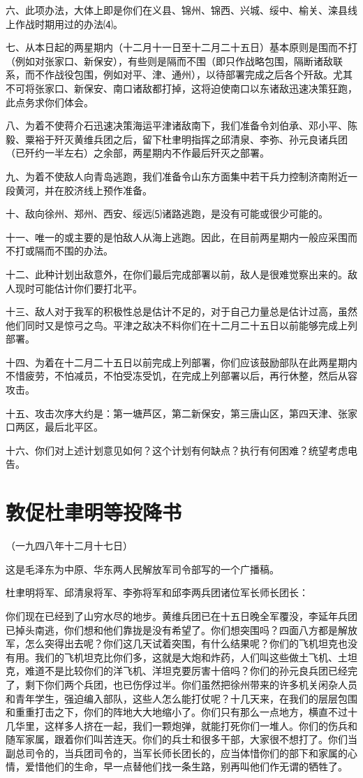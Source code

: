 \documentclass[UTF-8, a5paper, 12pt]{ctexart}
\begin{document}
六、此项办法，大体上即是你们在义县、锦州、锦西、兴城、绥中、榆关、滦县线上作战时期用过的办法⑷。

七、从本日起的两星期内（十二月十一日至十二月二十五日）基本原则是围而不打（例如对张家口、新保安），有些则是隔而不围（即只作战略包围，隔断诸敌联系，而不作战役包围，例如对平、津、通州），以待部署完成之后各个歼敌。尤其不可将张家口、新保安、南口诸敌都打掉，这将迫使南口以东诸敌迅速决策狂跑，此点务求你们体会。

八、为着不使蒋介石迅速决策海运平津诸敌南下，我们准备令刘伯承、邓小平、陈毅、粟裕于歼灭黄维兵团之后，留下杜聿明指挥之邱清泉、李弥、孙元良诸兵团（已歼约一半左右）之余部，两星期内不作最后歼灭之部署。

九、为着不使敌人向青岛逃跑，我们准备令山东方面集中若干兵力控制济南附近一段黄河，并在胶济线上预作准备。

十、敌向徐州、郑州、西安、绥远⑸诸路逃跑，是没有可能或很少可能的。

十一、唯一的或主要的是怕敌人从海上逃跑。因此，在目前两星期内一般应采围而不打或隔而不围的办法。

十二、此种计划出敌意外，在你们最后完成部署以前，敌人是很难觉察出来的。敌人现时可能估计你们要打北平。

十三、敌人对于我军的积极性总是估计不足的，对于自己力量总是估计过高，虽然他们同时又是惊弓之鸟。平津之敌决不料你们在十二月二十五日以前能够完成上列部署。

十四、为着在十二月二十五日以前完成上列部署，你们应该鼓励部队在此两星期内不惜疲劳，不怕减员，不怕受冻受饥，在完成上列部署以后，再行休整，然后从容攻击。

十五、攻击次序大约是：第一塘芦区，第二新保安，第三唐山区，第四天津、张家口两区，最后北平区。

十六、你们对上述计划意见如何？这个计划有何缺点？执行有何困难？统望考虑电告。

\section{敦促杜聿明等投降书}

（一九四八年十二月十七日）

这是毛泽东为中原、华东两人民解放军司令部写的一个广播稿。

杜聿明将军、邱清泉将军、李弥将军和邱李两兵团诸位军长师长团长：

你们现在已经到了山穷水尽的地步。黄维兵团已在十五日晚全军覆没，李延年兵团已掉头南逃，你们想和他们靠拢是没有希望了。你们想突围吗？四面八方都是解放军，怎么突得出去呢？你们这几天试着突围，有什么结果呢？你们的飞机坦克也没有用。我们的飞机坦克比你们多，这就是大炮和炸药，人们叫这些做土飞机、土坦克，难道不是比较你们的洋飞机、洋坦克要厉害十倍吗？你们的孙元良兵团已经完了，剩下你们两个兵团，也已伤俘过半。你们虽然把徐州带来的许多机关闲杂人员和青年学生，强迫编入部队，这些人怎么能打仗呢？十几天来，在我们的层层包围和重重打击之下，你们的阵地大大地缩小了。你们只有那么一点地方，横直不过十几华里，这样多人挤在一起，我们一颗炮弹，就能打死你们一堆人。你们的伤兵和随军家属，跟着你们叫苦连天。你们的兵士和很多干部，大家很不想打了。你们当副总司令的，当兵团司令的，当军长师长团长的，应当体惜你们的部下和家属的心情，爱惜他们的生命，早一点替他们找一条生路，别再叫他们作无谓的牺牲了。
\end{document}
